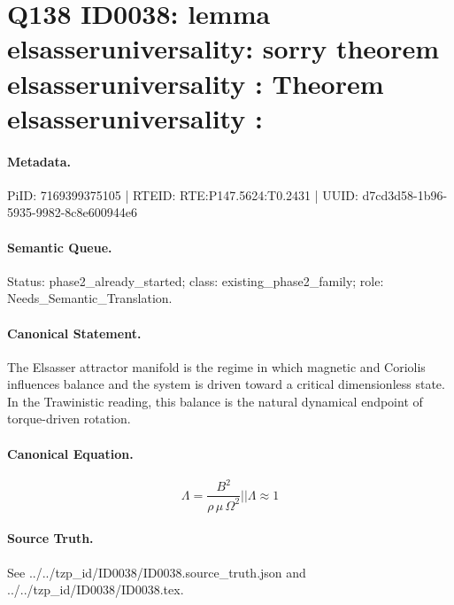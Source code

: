 \section*{Q138 ID0038: lemma elsasseruniversality: sorry theorem elsasseruniversality : Theorem elsasseruniversality :}
\paragraph{Metadata.}
PiID: 7169399375105 | RTEID: RTE:P147.5624:T0.2431 | UUID: d7cd3d58-1b96-5935-9982-8c8e600944e6

\paragraph{Semantic Queue.}
Status: phase2\_already\_started; class: existing\_phase2\_family; role: Needs\_Semantic\_Translation.

\paragraph{Canonical Statement.}
The Elsasser attractor manifold is the regime in which magnetic and Coriolis influences balance and the system is driven toward a critical dimensionless state. In the Trawinistic reading, this balance is the natural dynamical endpoint of torque-driven rotation.

\paragraph{Canonical Equation.}
\[
\Lambda = \frac{B^{2}}{\rho\,\mu\,\Omega^{2}} || \Lambda \approx 1
\]

\paragraph{Source Truth.}
See ../../tzp\_id/ID0038/ID0038.source\_truth.json and ../../tzp\_id/ID0038/ID0038.tex.

